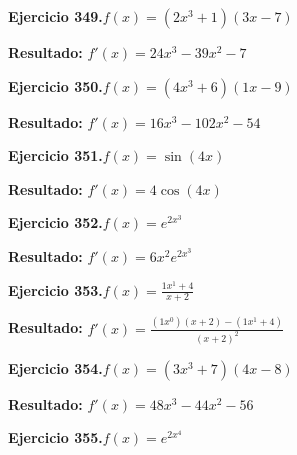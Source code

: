 \documentclass[10pt,a4paper]{article}
\begin{document}
\newpage
\begin{ejbox}
\textbf{Ejercicio 349.}\quad $f(x) = (2x^{3} +1)(3x -7)$
\end{ejbox}

\begin{solbox}
\textbf{Resultado:} \(\displaystyle f'(x) = 24x^{3} -39x^{2} -7\)
\end{solbox}

\begin{ejbox}
\textbf{Ejercicio 350.}\quad $f(x) = (4x^{3} +6)(1x -9)$
\end{ejbox}

\begin{solbox}
\textbf{Resultado:} \(\displaystyle f'(x) = 16x^{3} -102x^{2} -54\)
\end{solbox}

\begin{ejbox}
\textbf{Ejercicio 351.}\quad $f(x) = \sin(4x)$
\end{ejbox}

\begin{solbox}
\textbf{Resultado:} \(\displaystyle f'(x) = 4\cos(4x)\)
\end{solbox}

\newpage
\begin{ejbox}
\textbf{Ejercicio 352.}\quad $f(x) = e^{2x^{3}}$
\end{ejbox}

\begin{solbox}
\textbf{Resultado:} \(\displaystyle f'(x) = 6x^{2}e^{2x^{3}}\)
\end{solbox}

\begin{ejbox}
\textbf{Ejercicio 353.}\quad $f(x) = \frac{1x^{1} +4}{x + 2}$
\end{ejbox}

\begin{solbox}
\textbf{Resultado:} \(\displaystyle f'(x) = \frac{(1x^{0})(x+2) - (1x^{1} +4)}{(x+2)^2}\)
\end{solbox}

\begin{ejbox}
\textbf{Ejercicio 354.}\quad $f(x) = (3x^{3} +7)(4x -8)$
\end{ejbox}

\begin{solbox}
\textbf{Resultado:} \(\displaystyle f'(x) = 48x^{3} -44x^{2} -56\)
\end{solbox}

\newpage
\begin{ejbox}
\textbf{Ejercicio 355.}\quad $f(x) = e^{2x^{4}}$
\end{ejbox}
\end{document}
